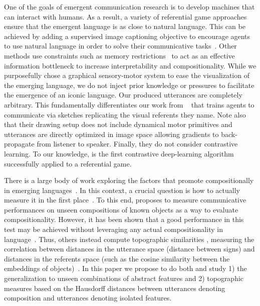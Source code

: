 One of the goals of emergent communication research is to develop machines that can interact with humans. As a result, a variety of referential game approaches ensure that the emergent language is as close to natural language. This can be achieved by adding a supervised image captioning objective to encourage agents to use natural language in order to solve their communicative tasks~\citep{havrylov2017emergence,lazaridou2017multiagent}. Other methods use constraints such as memory restrictions~\citep{kottur2017natural} to act as an effective information bottleneck to increase interpretability and compositionality. While we purposefully chose a graphical sensory-motor system to ease the visualization of the emerging language, we do not inject prior knowledge or pressures to facilitate the emergence of an iconic language. Our produced utterances are completely arbitrary. This fundamentally differentiates our work from ~\citet{mihai2021learning} that trains agents to communicate via sketches replicating the visual referents they name. Note also that their drawing setup does not include dynamical motor primitives and utterances are directly optimized in image space allowing gradients to back-propagate from listener to speaker. Finally, they do not consider contrastive learning. To our knowledge, \curves is the first contrastive deep-learning algorithm successfully applied to a referential game.

There is a large body of work exploring the factors that promote
compositionally in emerging languages~\citep{kottur2017natural,li2019ease,rodriguez-luna-etal-2020-internal,Ren2020Compositional,chaabouni2020compositionality,gupta-etal-2020-compositionality}. In this context, a crucial question is how to actually measure it in the first place~\citep{mu2021emergent}. To this end, \citep{choi2018compositional} proposes to measure communicative performances on unseen compositions of known objects as a way to evaluate compositionality. However, it has been shown that a good performance in this test may be achieved without leveraging any actual compositionality in language~\citep{andreas2019measuring, chaabouni2020compositionality}. Thus, others instead compute topographic similarities \citep{brighton2006understanding}, measuring the correlation between distances in the utterance space (distance between signs) and distances in the referents space (such as the cosine similarity between the embeddings of objects)~\citep{lazaridou2018emergence}. In this paper we propose to do both and study 1) the generalization to unseen combinations of abstract features and 2) topographic measures based on the Hausdorff distances between utterances denoting composition and utterances denoting isolated features. 

